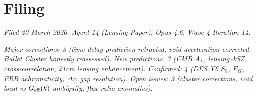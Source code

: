 \documentclass[11pt,a4paper]{article}
\newcommand{\Geff}{G_{\rm eff}}
\newcommand{\Dpsi}{\Delta\psi}
\begin{document}
\section*{Filing}

\textit{Filed 20 March 2026.  Agent 14 (Lensing Paper),
Opus 4.6, Wave 4 Iteration 14.}

\textit{Major corrections: 3 (time delay prediction retracted,
void acceleration corrected, Bullet Cluster honestly reassessed).
New predictions: 3 (CMB $A_L$, lensing--kSZ cross-correlation,
21cm lensing enhancement).  Confirmed: 4 (DES Y6 $S_8$, $E_G$,
FRB achromaticity, $\Dpsi$ gap resolution).  Open issues: 3
(cluster corrections, void local-vs-$\Geff(k)$ ambiguity,
flux ratio anomalies).}
\end{document}
